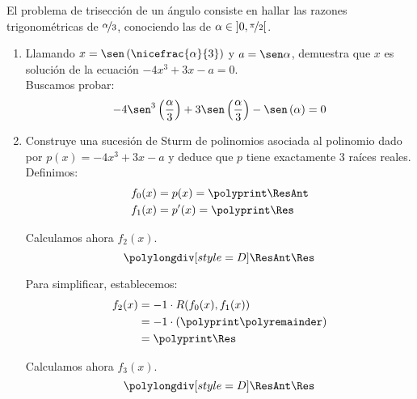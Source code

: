 \begin{ejercicio}
    El problema de trisección de un ángulo consiste en hallar las razones trigonométricas de $\nicefrac{\alpha}{3}$, conociendo las de $\alpha \in \left]0,\nicefrac{\pi}{2}\right[$.
    \begin{enumerate}
        \item Llamando $x = \sen\left(\nicefrac{\alpha}{3}\right)$ y $a = \sen \alpha$, demuestra que $x$ es solución de la ecuación $-4x^3 + 3x - a = 0$.\\
        
        Buscamos probar:
        \begin{align*}
            -4\sen^3\left(\frac{\alpha}{3}\right)+3\sen\left(\frac{\alpha}{3}\right)-\sen\left(\alpha\right)=0
        \end{align*}
        \item Construye una sucesión de Sturm de polinomios asociada al polinomio dado por $p(x) = -4x^3 + 3x - a$ y deduce que $p$ tiene exactamente 3 raíces reales.\\
        
        Definimos:
        \polymul{}
        \polymul{}
        \begin{align*}
            f_0(x) &= p(x)=\polyprint\ResAnt\\
            f_1(x) &= p'(x)=\polyprint\Res
        \end{align*}

        Calculamos ahora $f_2(x)$.
        \begin{equation*}
            \polylongdiv[style=D]\ResAnt\Res
        \end{equation*}
        \polydiv\div\ResAnt\Res
        \polymul\ResAnt{}
        \polymul\Res{}

        Para simplificar, establecemos:
        \begin{align*}
            f_2(x) &= -1\cdot R(f_0(x), f_1(x))\\
            &= -1\cdot \left(\polyprint\polyremainder\right)\\
            &= \polyprint\Res
        \end{align*}

        Calculamos ahora $f_3(x)$.
        \begin{equation*}
            \polylongdiv[style=D]\ResAnt\Res
        \end{equation*}
        \polydiv\div\ResAnt\Res
        \polymul\ResAnt{}
        \polymul\Res{}


\end{enumerate}
\end{ejercicio}
